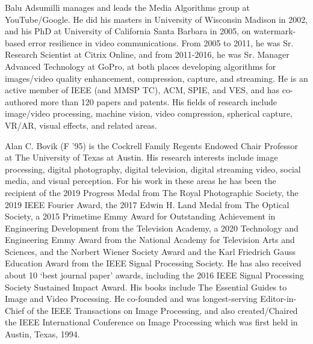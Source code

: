 \documentclass[journal]{IEEEtran}
\begin{document}
\begin{IEEEbiography}
{Balu Adsumilli} manages and leads the Media Algorithms group at YouTube/Google. He did his masters in University of Wisconsin Madison in 2002, and his PhD at University of California Santa Barbara in 2005, on watermark-based error resilience in video communications. From 2005 to 2011, he was Sr. Research Scientist at Citrix Online, and from 2011-2016, he was Sr. Manager Advanced Technology at GoPro, at both places developing algorithms for images/video quality enhancement, compression, capture, and streaming. He is an active member of IEEE (and MMSP TC), ACM, SPIE, and VES, and has co-authored more than 120 papers and patents. His fields of research include image/video processing, machine vision, video compression, spherical capture, VR/AR, visual effects, and related areas.
\end{IEEEbiography}

\begin{IEEEbiography}{Alan C. Bovik} (F ’95) is the Cockrell Family Regents Endowed Chair Professor at The University of Texas at Austin. His research interests include image processing, digital photography, digital television, digital streaming video, social media, and visual perception. For his work in these areas he has been the recipient of the 2019 Progress Medal from The Royal Photographic Society, the 2019 IEEE Fourier Award, the 2017 Edwin H. Land Medal from The Optical Society, a 2015 Primetime Emmy Award for Outstanding Achievement in Engineering Development from the Television Academy, a 2020 Technology and Engineering Emmy Award from the National Academy for Television Arts and Sciences, and the Norbert Wiener Society Award and the Karl Friedrich Gauss Education Award from the IEEE Signal Processing Society. He has also received about 10 ‘best journal paper’ awards, including the 2016 IEEE Signal Processing Society Sustained Impact Award. His books include The Essential Guides to Image and Video Processing. He co-founded and was longest-serving Editor-in-Chief of the IEEE Transactions on Image Processing, and also created/Chaired the IEEE International Conference on Image Processing which was first held in Austin, Texas, 1994.
\end{IEEEbiography}
\end{document}
